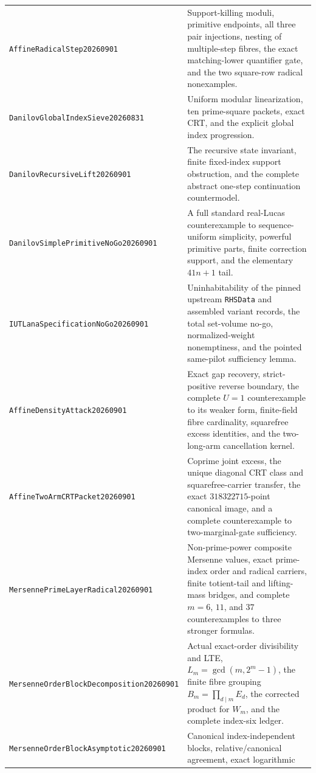 \documentclass[11pt]{amsart}
\theoremstyle{definition}
\theoremstyle{remark}
\begin{document}
\begin{longtable}{>{\raggedright\arraybackslash}p{}>{\raggedright\arraybackslash}p{}}
\texttt{AffineRadical\allowbreak Step20260901} & Support-killing moduli,
primitive endpoints, all three pair injections, nesting of multiple-step
fibres, the exact matching-lower quantifier gate, and the two square-row
radical nonexamples.\\[3pt]
\texttt{DanilovGlobalIndex\allowbreak Sieve20260831} & Uniform modular
linearization, ten prime-square packets, exact CRT, and the explicit global
index progression.\\[3pt]
\texttt{DanilovRecursive\allowbreak Lift20260901} & The recursive state
invariant, finite fixed-index support obstruction, and the complete abstract
one-step continuation countermodel.\\[3pt]
\texttt{DanilovSimplePrimitive\allowbreak NoGo20260901} & A full standard
real-Lucas counterexample to sequence-uniform simplicity, powerful primitive
parts, finite correction support, and the elementary $41n+1$ tail.\\[3pt]
\texttt{IUTLanaSpecification\allowbreak NoGo20260901} & Uninhabitability of
the pinned upstream \texttt{RHSData} and assembled variant records, the total
set-volume no-go, normalized-weight nonemptiness, and the pointed same-pilot
sufficiency lemma.\\
\texttt{AffineDensity\allowbreak Attack20260901} & Exact gap recovery,
strict-positive reverse boundary, the complete $U=1$ counterexample to its
weaker form, finite-field fibre cardinality, squarefree excess identities,
and the two-long-arm cancellation kernel.\\[3pt]
\texttt{AffineTwoArmCRT\allowbreak Packet20260901} & Coprime joint excess,
the unique diagonal CRT class and squarefree-carrier transfer, the exact
$318322715$-point canonical image, and a complete counterexample to
two-marginal-gate sufficiency.\\[3pt]
\texttt{MersennePrimeLayer\allowbreak Radical20260901} & Non-prime-power
composite Mersenne values, exact prime-index order and radical carriers,
finite totient-tail and lifting-mass bridges, and complete $m=6$, $11$, and
$37$ counterexamples to three stronger formulas.\\[3pt]
\texttt{MersenneOrderBlock\allowbreak Decomposition20260901} & Actual
exact-order divisibility and LTE, $L_m=\gcd(m,2^m-1)$, the finite fibre
grouping $B_m=\prod_{d\mid m}E_d$, the corrected product for $W_m$, and the
complete index-six ledger.\\[3pt]
\texttt{MersenneOrderBlock\allowbreak Asymptotic20260901} & Canonical
index-independent blocks, relative/canonical agreement, exact logarithmic

\end{longtable}
\end{document}
